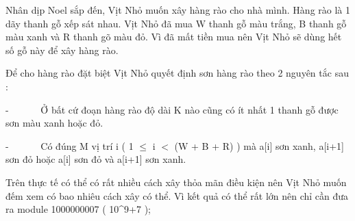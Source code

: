 Nhân dịp Noel sắp đến, Vịt Nhỏ muốn xây hàng rào cho nhà mình. Hàng rào là 1 dãy thanh gỗ xếp sát nhau. Vịt Nhỏ đã mua W thanh gỗ màu trắng, B thanh gỗ màu xanh và R thanh gõ màu đỏ. Vì đã mất tiền mua nên Vịt Nhỏ sẽ dùng hết số gỗ này để xây hàng rào.  

   Để cho hàng rào đặt biệt Vịt Nhỏ quyết định sơn hàng rào theo 2 nguyên tắc sau :  

   -       Ở bất cứ đoạn hàng rào độ dài K nào cũng có ít nhất 1 thanh gỗ được sơn màu xanh hoặc đỏ.  

   -       Có đúng M vị trí i ( 1  $\le$  i $<$ (W + B + R) ) mà a[i] sơn xanh, a[i+1] sơn đỏ hoặc a[i] sơn đỏ và a[i+1] sơn xanh.  

   Trên thực tế có thể có rất nhiều cách xây thỏa mãn điều kiện nên Vịt Nhỏ muốn đếm xem có bao nhiêu cách xây có thể. Vì kết quả có thể rất lớn nên chỉ cần đưa ra module 1000000007 ( 10^9+7 );  

\